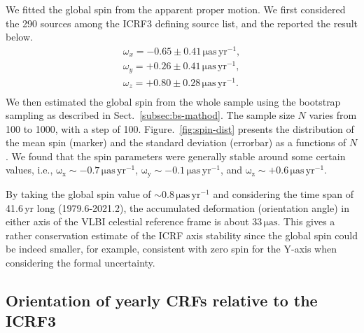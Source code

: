 \documentclass{aa}
\begin{document}
    We fitted the global spin from the apparent proper motion.
    We first considered the 290 sources among the ICRF3 defining source list, and the reported the result below.
    \begin{equation} \label{eq:spin-from-def}
         \begin{array}{l}
             \omega_x = -0.65 \pm 0.41\,\mathrm{\mu as\,yr^{-1}}, \\
             \omega_y = +0.26 \pm 0.41\,\mathrm{\mu as\,yr^{-1}}, \\
             \omega_z = +0.80 \pm 0.28\,\mathrm{\mu as\,yr^{-1}}. \\
         \end{array}
    \end{equation}
    We then estimated the global spin from the whole sample using the bootstrap sampling as described in Sect.~\ref{subsec:bs-mathod}.
    The sample size $N$ varies from 100 to 1000, with a step of 100.
    Figure.~\ref{fig:spin-dist} presents the distribution of the mean spin (marker) and the standard deviation (errorbar) as a functions of $N$.
    We found that the spin parameters were generally stable around some certain values, i.e., $\mathrm{\omega_x\sim-0.7\,\mu as\,yr^{-1}}$,  $\mathrm{\omega_y\sim-0.1\,\mu as\,yr^{-1}}$, and  $\mathrm{\omega_z\sim+0.6\,\mu as\,yr^{-1}}$.
    
    By taking the global spin value of $\mathrm{\sim 0.8\,\mu as\,yr^{-1}}$ and considering the time span of 41.6\,yr long (1979.6-2021.2), the accumulated deformation (orientation angle) in either axis of the VLBI celestial reference frame is about $\mathrm{33\,\mu as}$.
    This gives a rather conservation estimate of the ICRF axis stability since the global spin could be indeed smaller, for example, consistent with zero spin for the Y-axis when considering the formal uncertainty.


\subsection{Orientation of yearly CRFs relative to the ICRF3}  \label{subsec:orient-from-yearly-crf}
    
\end{document}
